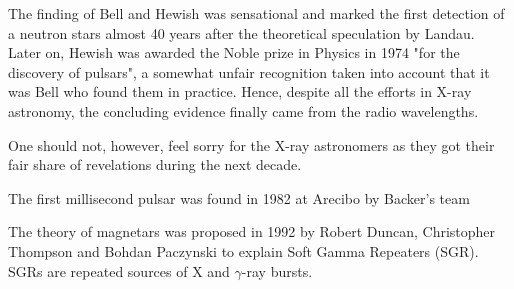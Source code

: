 The finding of Bell and Hewish was sensational and marked the first detection of a neutron stars almost 40 years after the theoretical speculation by Landau.
Later on, Hewish was awarded the Noble prize in Physics in 1974 "for the discovery of pulsars", a somewhat unfair recognition taken into account that it was Bell who found them in practice.
Hence, despite all the efforts in X-ray astronomy, the concluding evidence finally came from the radio wavelengths.


%
%
%

One should not, however, feel sorry for the X-ray astronomers as they got their fair share of revelations during the next decade.


The first millisecond pulsar was found in 1982 at Arecibo by Backer’s team

The theory of magnetars was proposed in 1992 by Robert Duncan, Christopher Thompson and Bohdan Paczynski to explain Soft Gamma Repeaters (SGR). SGRs are repeated sources of X and $\gamma$-ray bursts. \cite{DT92}

